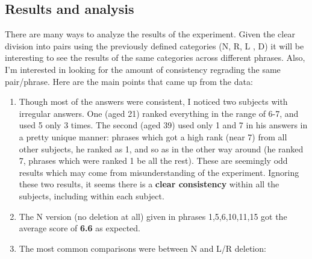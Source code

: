 \documentclass{article}
\begin{document}
\subsection{Results and analysis}
There are many ways to analyze the results of the experiment. Given the clear division into pairs using the previously defined categories (N, R, L , D) it will be interesting to see the results of the same categories across different phrases.  Also,  I'm interested in looking for the amount of consistency regrading the same pair/phrase.  Here are the main points that came up from the data:
\begin{enumerate}
  \item Though most of the answers were consistent,  I noticed two subjects with irregular answers. One (aged 21) ranked everything in the range of 6-7,  and used 5 only 3 times.  The second (aged 39) used only 1 and 7 in his answers in a pretty unique manner: phrases which got a high rank (near 7) from all other subjects, he ranked as 1,  and so as in the other way around (he ranked 7, phrases which were ranked 1 be all the rest). 
These are seemingly odd results which may come from misunderstanding of the experiment. Ignoring these two results, it seems there is a \textbf{clear consistency} within all the subjects, including within each subject.
  \item The N version (no deletion at all) given in phrases 1,5,6,10,11,15 got the average score of \textbf{6.6} as expected.
  \item The most common comparisons were between N and L/R deletion:


\end{enumerate}
\end{document}
